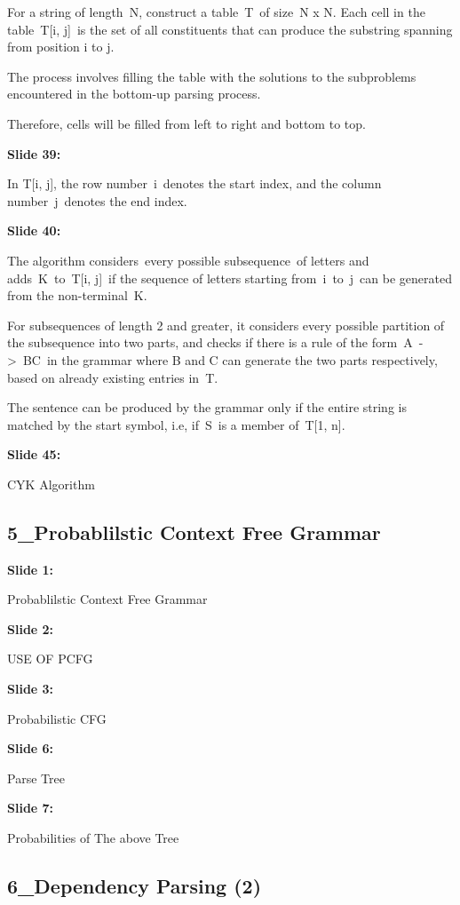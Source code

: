 \documentclass[11pt,a4paper]{article}
\begin{document}
For a string of length N, construct a table T of size N x N. Each cell in the table T[i, j] is the set of all constituents that can produce the substring spanning from position i to j.

The process involves filling the table with the solutions to the subproblems encountered in the bottom-up parsing process.

Therefore, cells will be filled from left to right and bottom to top.

\textbf{Slide 39:}

In T[i, j], the row number i denotes the start index, and the column number j denotes the end index.

\textbf{Slide 40:}

The algorithm considers every possible subsequence of letters and adds K to T[i, j] if the sequence of letters starting from i to j can be generated from the non-terminal K.

For subsequences of length 2 and greater, it considers every possible partition of the subsequence into two parts, and checks if there is a rule of the form A -> BC in the grammar where B and C can generate the two parts respectively, based on already existing entries in T.

The sentence can be produced by the grammar only if the entire string is matched by the start symbol, i.e, if S is a member of T[1, n].

\textbf{Slide 45:}

CYK Algorithm


\subsection{5_Probablilstic Context Free Grammar}

\textbf{Slide 1:}

Probablilstic Context Free Grammar

\textbf{Slide 2:}

USE OF PCFG

\textbf{Slide 3:}

Probabilistic CFG

\textbf{Slide 6:}

Parse Tree

\textbf{Slide 7:}

Probabilities of The above Tree


\subsection{6_Dependency Parsing (2)}
\end{document}
